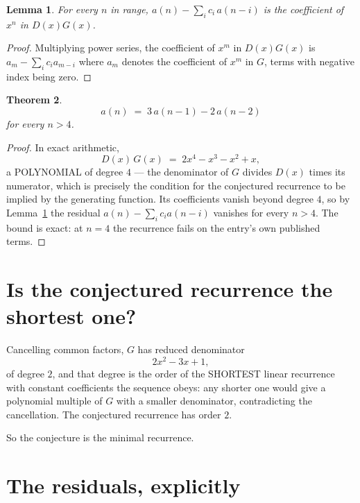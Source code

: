 \documentclass[11pt,a4paper]{article}
\theoremstyle{plain}
\newtheorem{theorem}{Theorem}
\newtheorem{lemma}[theorem]{Lemma}
\theoremstyle{definition}
\begin{document}
\begin{lemma}\label{lem:key}
For every $n$ in range, $a(n)-\sum_i c_i\,a(n-i)$ is the coefficient of $x^{n}$ in
$D(x)G(x)$.
\end{lemma}

\begin{proof}
Multiplying power series, the coefficient of $x^{m}$ in $D(x)G(x)$ is
$a_m-\sum_i c_i a_{m-i}$ where $a_m$ denotes the coefficient of $x^{m}$ in $G$, terms with
negative index being zero.
\end{proof}

\begin{theorem}
\[
a(n)\;=\;3\,a(n-1) - 2\,a(n-2)
\]
for every $n>4$.
\end{theorem}

\begin{proof}
In exact arithmetic,
\[
D(x)\,G(x)\;=\;2 x^{4} - x^{3} - x^{2} + x,
\]
a POLYNOMIAL of degree $4$ --- the denominator of $G$ divides $D(x)$ times its numerator,
which is precisely the condition for the conjectured recurrence to be implied by the
generating function. Its coefficients vanish beyond degree $4$, so by
Lemma~\ref{lem:key} the residual $a(n)-\sum_ic_ia(n-i)$ vanishes for every
$n>4$. The bound is exact: at $n=4$ the recurrence fails on the entry's own published terms.
\end{proof}

\section{Is the conjectured recurrence the shortest one?}

Cancelling common factors, $G$ has reduced denominator
\[
2 x^{2} - 3 x + 1,
\]
of degree $2$, and that degree is the order of the SHORTEST linear recurrence with
constant coefficients the sequence obeys: any shorter one would give a polynomial multiple of
$G$ with a smaller denominator, contradicting the cancellation. The conjectured recurrence has
order $2$.

So the conjecture is the minimal recurrence.

\section{The residuals, explicitly}
\end{document}

